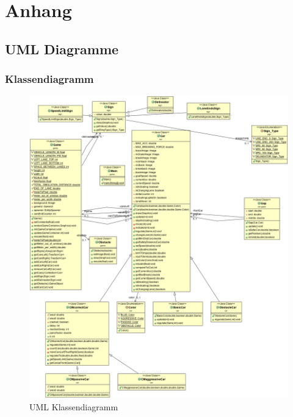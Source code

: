 \chapter{Anhang}
\section{UML Diagramme}
\subsection{Klassendiagramm}
\begin{figure}
	\includegraphics[width=\linewidth]{images/classuml.png}
	\caption{UML Klassendiagramm}
	\label{fig:umlclass}
	\end{figure}
